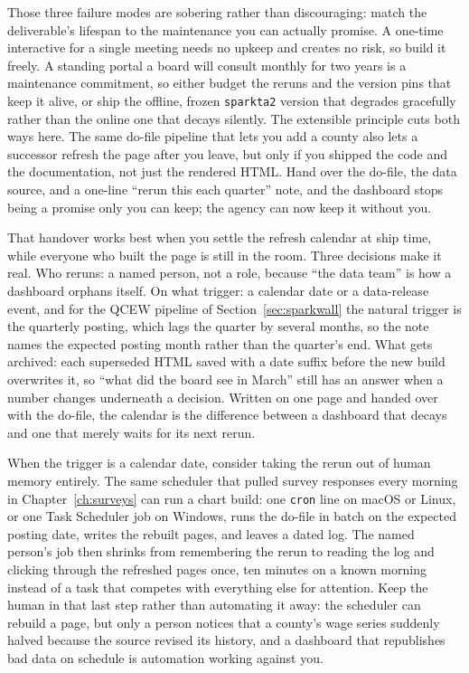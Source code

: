 \documentclass[
    a4paper,
    fontsize=10pt,
    twoside=true,
    numbers=noenddot,
]{kaobook}
\begin{document}
Those three failure modes are sobering rather than discouraging: match the deliverable's lifespan to the maintenance you can actually promise. A one-time interactive for a single meeting needs no upkeep and creates no risk, so build it freely. A standing portal a board will consult monthly for two years is a maintenance commitment, so either budget the reruns and the version pins that keep it alive, or ship the offline, frozen \texttt{sparkta2} version that degrades gracefully rather than the online one that decays silently. The extensible principle cuts both ways here. The same do-file pipeline that lets you add a county also lets a successor refresh the page after you leave, but only if you shipped the code and the documentation, not just the rendered HTML. Hand over the do-file, the data source, and a one-line \enquote{rerun this each quarter} note, and the dashboard stops being a promise only you can keep; the agency can now keep it without you.

That handover works best when you settle the refresh calendar at ship time, while everyone who built the page is still in the room. Three decisions make it real. Who reruns: a named person, not a role, because \enquote{the data team} is how a dashboard orphans itself. On what trigger: a calendar date or a data-release event, and for the QCEW pipeline of Section~\ref{sec:sparkwall} the natural trigger is the quarterly posting, which lags the quarter by several months, so the note names the expected posting month rather than the quarter's end. What gets archived: each superseded HTML saved with a date suffix before the new build overwrites it, so \enquote{what did the board see in March} still has an answer when a number changes underneath a decision. Written on one page and handed over with the do-file, the calendar is the difference between a dashboard that decays and one that merely waits for its next rerun.

When the trigger is a calendar date, consider taking the rerun out of human memory entirely. The same scheduler that pulled survey responses every morning in Chapter~\ref{ch:surveys} can run a chart build: one \texttt{cron} line on macOS or Linux, or one Task Scheduler job on Windows, runs the do-file in batch on the expected posting date, writes the rebuilt pages, and leaves a dated log. The named person's job then shrinks from remembering the rerun to reading the log and clicking through the refreshed pages once, ten minutes on a known morning instead of a task that competes with everything else for attention. Keep the human in that last step rather than automating it away: the scheduler can rebuild a page, but only a person notices that a county's wage series suddenly halved because the source revised its history, and a dashboard that republishes bad data on schedule is automation working against you.
\end{document}
